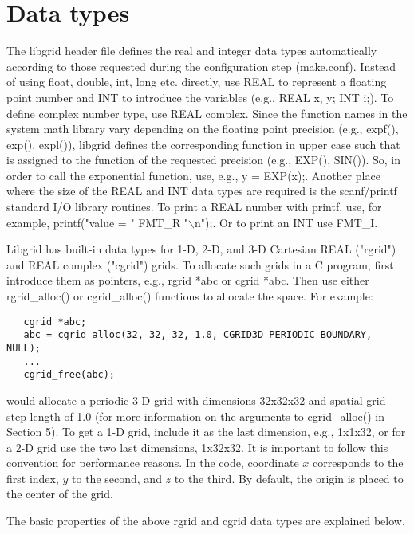 \documentclass[12pt,letterpaper]{report}
\begin{document}
\section{Data types}

The libgrid header file defines the real and integer data types automatically according to those requested during the configuration step (make.conf). Instead of using float, double, int, long etc. directly, use REAL to represent a floating point number and INT to introduce the variables (e.g., REAL x, y; INT i;). To define complex number type, use REAL complex. Since the function names in the system math library vary depending on the floating point precision (e.g., expf(), exp(), expl()), libgrid defines the corresponding function in upper case such that is assigned to the function of the requested precision (e.g., EXP(), SIN()). So, in order to call the exponential function, use, e.g., y = EXP(x);. Another place where the size of the REAL and INT data types are required is the scanf/printf standard I/O library routines. To print a REAL number with printf, use, for example, printf("value = " FMT\_R "$\backslash$n");. Or to print an INT use FMT\_I.

Libgrid has built-in data types for 1-D, 2-D, and 3-D Cartesian REAL ("rgrid") and REAL complex ("cgrid") grids. To allocate such grids in a C program, first introduce them as pointers, e.g., rgrid *abc or cgrid *abc. Then use either rgrid\_alloc() or cgrid\_alloc() functions to allocate the space. For example:
\begin{verbatim}
   cgrid *abc;
   abc = cgrid_alloc(32, 32, 32, 1.0, CGRID3D_PERIODIC_BOUNDARY, NULL);
   ...
   cgrid_free(abc);
\end{verbatim}
would allocate a periodic 3-D grid with dimensions 32x32x32 and spatial grid step length of 1.0 (for more information on the arguments to cgrid\_alloc() in Section 5). To get a 1-D grid, include it as the last dimension, e.g., 1x1x32, or for a 2-D grid use the two last dimensions, 1x32x32. It is important to follow this convention for performance reasons. In the code, coordinate $x$ corresponds to the first index, $y$ to the second, and $z$ to the third. By default, the origin is placed to the center of the grid.

The basic properties of the above rgrid and cgrid data types are explained below.
\end{document}
